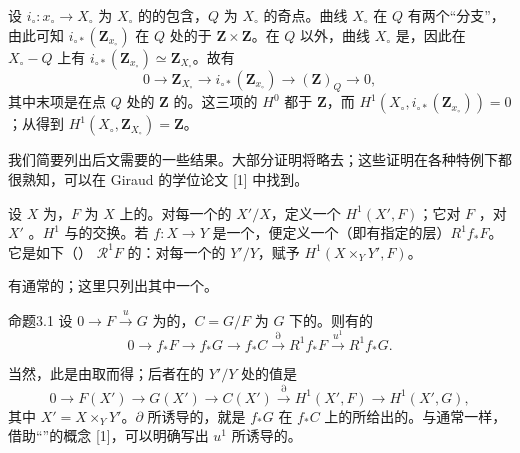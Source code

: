 设 $i_\circ:x_\circ\to X_\circ$ 为 $X_\circ$ 的的包含，$Q$ 为 $X_\circ$ 的奇点。曲线 $X_\circ$ 在 $Q$ 有两个“分支”，由此可知 $i_{\circ *}(\mathbf Z_{x_\circ})$ 在 $Q$ 处的于 $\mathbf Z\times\mathbf Z$。在 $Q$ 以外，曲线 $X_\circ$ 是，因此在 $X_\circ-Q$ 上有 $i_{\circ *}(\mathbf Z_{x_\circ})\simeq\mathbf Z_{X_\circ}$。故有
\[
0\longrightarrow\mathbf Z_{X_\circ}\longrightarrow i_{\circ *}(\mathbf Z_{x_\circ})
\longrightarrow(\mathbf Z)_Q\longrightarrow0,
\]
其中末项是在点 $Q$ 处的 $\mathbf Z$ 的。这三项的 $H^0$ 都于 $\mathbf Z$，而 $H^1(X_\circ,i_{\circ *}(\mathbf Z_{x_\circ}))=0$；从得到 $H^1(X_\circ,\mathbf Z_{X_\circ})=\mathbf Z$。

我们简要列出后文需要的一些结果。大部分证明将略去；这些证明在各种特例下都很熟知，可以在 Giraud 的学位论文 [1] 中找到。

设 $X$ 为，$F$ 为 $X$ 上的。对每一个的 $X'/X$，定义一个 $H^1(X',F)$；它对 $F$ ，对 $X'$ 。$H^1$ 与的交换。若 $f:X\to Y$ 是一个，便定义一个（即有指定的层）$R^1f_*F$。它是如下（） $\mathscr R^1F$ 的：对每一个的 $Y'/Y$，赋予 $H^1(X\times_Y Y',F)$。

有通常的；这里只列出其中一个。
\begin{SGAresult}{命题}{3.1}
设 $0\to F\xrightarrow{u}G$ 为的，$C=G/F$ 为 $G$ 下的。则有的
\[
0\to f_*F\to f_*G\to f_*C\xrightarrow{\partial}R^1f_*F\xrightarrow{u^1}R^1f_*G.
\]
\end{SGAresult}
当然，此是由取而得；后者在的 $Y'/Y$ 处的值是
\[
0\to F(X')\to G(X')\to C(X')\xrightarrow{\partial}H^1(X',F)\to H^1(X',G),
\]
其中 $X'=X\times_Y Y'$。$\partial$ 所诱导的，就是 $f_*G$ 在 $f_*C$ 上的所给出的。与通常一样，借助“”的概念 [1]，可以明确写出 $u^1$ 所诱导的。

